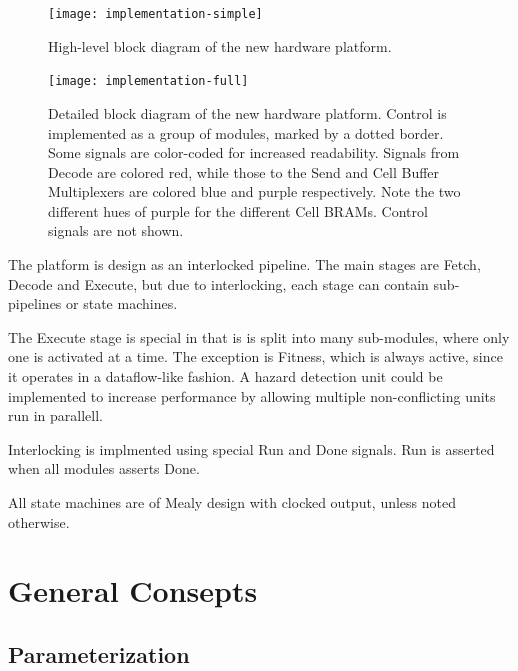 \begin{figure}[!ht]
    \centering
    \texttt{[image: implementation-simple]}
    \caption[High-level system diagram]{High-level block diagram of the new hardware platform.}
    \label{fig:implementation-simple}
\end{figure}

\begin{figure}
    \centering
    \texttt{[image: implementation-full]}
    \caption[Detailed system diagram]{
        Detailed block diagram of the new hardware platform.
        Control is implemented as a group of modules, marked by a dotted border.
        Some signals are color-coded for increased readability.
        Signals from Decode are colored red, while those to the Send and Cell Buffer Multiplexers are colored blue and purple respectively.
        Note the two different hues of purple for the different Cell BRAMs.
        Control signals are not shown.
    }
    \label{fig:implementation-full}
\end{figure}

The platform is design as an interlocked pipeline.
The main stages are Fetch, Decode and Execute, but due to interlocking, each stage can contain sub-pipelines or state machines.

The Execute stage is special in that is is split into many sub-modules, where only one is activated at a time.
The exception is Fitness, which is always active, since it operates in a dataflow-like fashion.
A hazard detection unit could be implemented to increase performance by allowing multiple non-conflicting units run in parallell.

Interlocking is implmented using special Run and Done signals.
Run is asserted when all modules asserts Done.

All state machines are of Mealy design with clocked output, unless noted otherwise.


\section{General Consepts}


\subsection{Parameterization}

